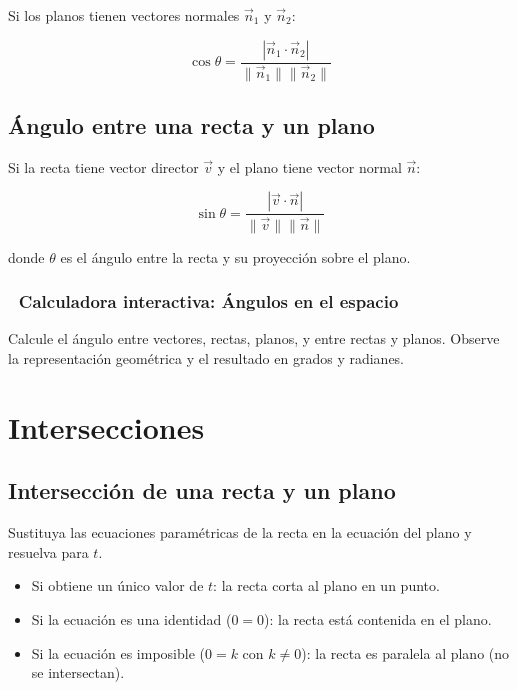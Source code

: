 \documentclass[
]{book}
\providecommand{\tightlist}{%
  \setlength{\itemsep}{0pt}\setlength{\parskip}{0pt}}
\begin{document}
Si los planos tienen vectores normales \(\vec{n}_1\) y \(\vec{n}_2\):

\[
\cos\theta = \frac{|\vec{n}_1 \cdot \vec{n}_2|}{\|\vec{n}_1\| \|\vec{n}_2\|}
\]

\subsection{Ángulo entre una recta y un plano}\label{uxe1ngulo-entre-una-recta-y-un-plano}

Si la recta tiene vector director \(\vec{v}\) y el plano tiene vector normal \(\vec{n}\):

\[
\sin\theta = \frac{|\vec{v} \cdot \vec{n}|}{\|\vec{v}\| \|\vec{n}\|}
\]

donde \(\theta\) es el ángulo entre la recta y su proyección sobre el plano.

\subsubsection{🧮 Calculadora interactiva: Ángulos en el espacio}\label{calculadora-interactiva-uxe1ngulos-en-el-espacio}

Calcule el ángulo entre vectores, rectas, planos, y entre rectas y planos. Observe la representación geométrica y el resultado en grados y radianes.

\section{Intersecciones}\label{intersecciones}

\subsection{Intersección de una recta y un plano}\label{intersecciuxf3n-de-una-recta-y-un-plano}

Sustituya las ecuaciones paramétricas de la recta en la ecuación del plano y resuelva para \(t\).

\begin{itemize}
\tightlist
\item
  Si obtiene un único valor de \(t\): la recta corta al plano en un punto.
\item
  Si la ecuación es una identidad (\(0 = 0\)): la recta está contenida en el plano.
\item
  Si la ecuación es imposible (\(0 = k\) con \(k \neq 0\)): la recta es paralela al plano (no se intersectan).
\end{itemize}
\end{document}
